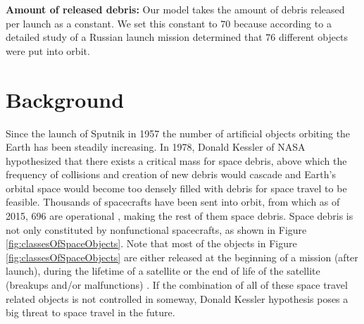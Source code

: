 \documentclass{article}
\theoremstyle{definition}
\begin{document}
\begin{enumerat}
\textbf{Amount of released debris: }Our model takes the amount of debris released per launch as a constant. We set this constant to $70$ because according to \cite{orbitalDebris} a detailed study of a Russian launch mission determined that $76$ different objects were put into orbit.


\section{Background}\label{Background}

Since the launch of Sputnik in 1957 the number of artificial objects orbiting the Earth has been steadily increasing. In 1978, Donald Kessler of NASA hypothesized that there exists a critical mass for space debris, above which the frequency of collisions and creation of new debris would cascade and Earth's orbital space would become too densely filled with debris for space travel to be feasible. Thousands of spacecrafts have been sent into orbit, from which as of 2015, 696 are operational \cite{satelliteDB}, making the rest of them space debris. Space debris is not only constituted by nonfunctional spacecrafts, as shown in Figure \ref{fig:classesOfSpaceObjects}. Note that most of the objects in Figure \ref{fig:classesOfSpaceObjects} are either released at the beginning of a mission (after launch), during the lifetime of a satellite or the end of life of the satellite (breakups and/or malfunctions) \cite{orbitalDebris, studyOfOrbitalDebris}. If the combination of all of these space travel related objects is not controlled in someway, Donald Kessler hypothesis poses a big threat to space travel in the future.




\end{enumerat}
\end{document}
